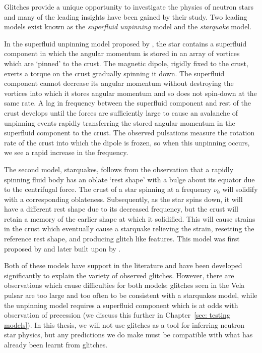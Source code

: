Glitches provide a unique opportunity to investigate the physics of neutron
stars and many of the leading insights have been gained by their study. Two
leading models exist known as the \emph{superfluid unpinning} model and the
\emph{starquake} model.

In the superfluid unpinning model proposed by \citet{Anderson1975}, the star
contains a superfluid component in which the angular momentum is stored in an
array of vortices which are `pinned' to the crust. The magnetic dipole, rigidly
fixed to the crust, exerts a torque on the crust gradually spinning it down.
The superfluid component cannot decrease its angular momentum without
destroying the vortices into which it stores angular momentum and so does not
spin-down at the same rate.  A lag in frequency between the superfluid
component and rest of the crust develops until the forces are sufficiently
large to cause an avalanche of unpinning events rapidly transferring the stored
angular momentum in the superfluid component to the crust. The observed
pulsations measure the rotation rate of the crust into which the dipole is
frozen, so when this unpinning occurs, we see a rapid increase in the
frequency.

The second model, starquakes, follows from the observation that a rapidly
spinning fluid body has an oblate `rest shape' with a bulge about its equator
due to the centrifugal force. The crust of a star spinning at a frequency $\nu_0$
will solidify with a corresponding oblateness. Subsequently, as the star spins down,
it will have a different rest shape due to its decreased frequency, but the crust
will retain a memory of the earlier shape at which it solidified. This will cause
strains in the crust which eventually cause a starquake relieving the strain,
resetting the reference rest shape, and producing glitch like features. This
model was first proposed by \citet{Ruderman1969} and later built upon by
\citet{Baym1971}.

Both of these models have support in the literature and have been developed
significantly to explain the variety of observed glitches. However, there are
observations which cause difficulties for both models: glitches seen in the
Vela pulsar are too large and too often to be consistent with a starquakes
model, while the unpinning model requires a superfluid component which is at
odds with observation of precession (we discuss this further in
Chapter~\ref{sec: testing models}). In this thesis, we will not use glitches
as a tool for inferring neutron star physics, but any predictions we do make
must be compatible with what has already been learnt from glitches.


